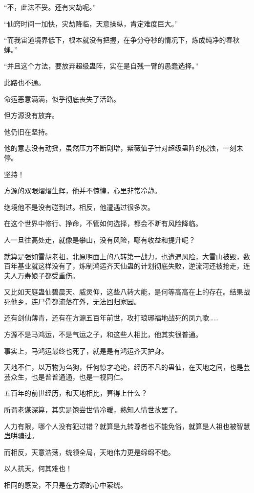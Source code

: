 \begin{this_body}
“不，此法不妥。还有灾劫呢。”

“仙窍时间一加快，灾劫降临，天意操纵，肯定难度巨大。”

“而我宙道境界低下，根本就没有把握，在争分夺秒的情况下，炼成纯净的春秋蝉。”

“并且这个方法，要放弃超级蛊阵，实在是自残一臂的愚蠢选择。”

此路也不通。

命运恶意满满，似乎彻底丧失了活路。

但方源没有放弃。

他仍旧在坚持。

他的意志没有动摇，虽然压力不断剧增，紫薇仙子针对超级蛊阵的侵蚀，一刻未停。

坚持！

方源的双眼熠熠生辉，他并不惊惶，心里非常冷静。

绝境他不是没有碰到过。相反，他遭遇过很多次。

在这个世界中修行、挣命，不管如何选择，都会不断有风险降临。

人一旦往高处走，就像是攀山，没有风险，哪有收益和提升呢？

就算是强如雪胡老祖，北原明面上的八转第一战力，也遭遇风险，大雪山被毁，数百年基业就这样没有了，炼制鸿运齐天仙蛊的计划彻底失败，逆流河还被抢走，连夫人万寿娘子都受重伤。

又比如天庭蛊仙碧晨天、威灵仰，这些八转大能，是何等高高在上的存在。结果战死他乡，连尸骨都流落在外，无法回归家园。

还有剑仙薄青，还有在方源五百年前世，攻打琅琊福地战死的凤九歌……

方源不是马鸿运，不是气运之子，和这些人相比，他其实很普通。

事实上，马鸿运最终也死了，就是是有鸿运齐天护身。

天地不仁，以万物为刍狗，任何惊才艳艳，经历不凡的蛊仙，在天地之间，也是芸芸众生，也是普普通通，也是一视同仁。

五百年的前世经历，和天地相比，算得上什么？

所谓老谋深算，其实是饱尝世情冷暖，熟知人情世故罢了。

人力有限，哪个人没有犯过错？就算是九转尊者也不能免俗，就算是人祖也被智慧蛊哄骗过。

而相反，天意浩荡，统领全局，天地伟力更是绵绵不绝。

以人抗天，何其难也！

相同的感受，不只是在方源的心中萦绕。


\end{this_body}
